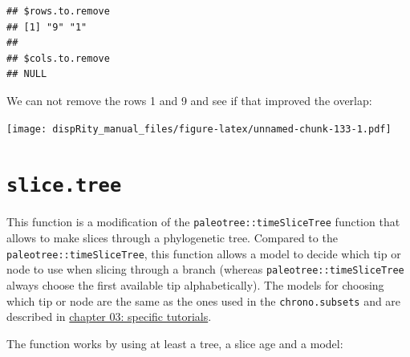 \documentclass[]{book}
\newenvironment{Shaded}{\begin{snugshade}}{\end{snugshade}}
\newcommand{\DataTypeTok}[1]{\textcolor[rgb]{0.13,0.29,0.53}{#1}}
\newcommand{\KeywordTok}[1]{\textcolor[rgb]{0.13,0.29,0.53}{\textbf{#1}}}
\newcommand{\NormalTok}[1]{#1}
\newcommand{\OperatorTok}[1]{\textcolor[rgb]{0.81,0.36,0.00}{\textbf{#1}}}
\newcommand{\StringTok}[1]{\textcolor[rgb]{0.31,0.60,0.02}{#1}}
\begin{document}
\begin{verbatim}
## $rows.to.remove
## [1] "9" "1"
## 
## $cols.to.remove
## NULL
\end{verbatim}

We can not remove the rows 1 and 9 and see if that improved the overlap:

\begin{Shaded}
\end{Shaded}

\texttt{[image: dispRity\_manual\_files/figure-latex/unnamed-chunk-133-1.pdf]}

\hypertarget{slice.tree}{%
\section{\texorpdfstring{\texttt{slice.tree}}{slice.tree}}\label{slice.tree}}

This function is a modification of the \texttt{paleotree::timeSliceTree} function that allows to make slices through a phylogenetic tree.
Compared to the \texttt{paleotree::timeSliceTree}, this function allows a model to decide which tip or node to use when slicing through a branch (whereas \texttt{paleotree::timeSliceTree} always choose the first available tip alphabetically).
The models for choosing which tip or node are the same as the ones used in the \texttt{chrono.subsets} and are described in \protect\hyperlink{chrono-subsets}{chapter 03: specific tutorials}.

The function works by using at least a tree, a slice age and a model:
\end{document}
